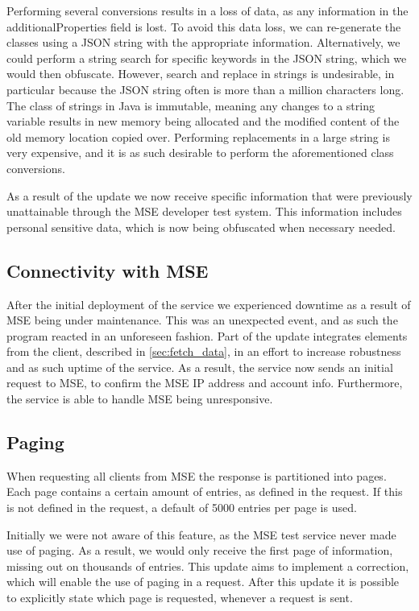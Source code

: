 Performing several conversions results in a loss of data, as any information in the additionalProperties field is lost. To avoid this data loss, we can re-generate the classes using a JSON string with the appropriate information. Alternatively, we could perform a string search for specific keywords in the JSON string, which we would then obfuscate. However, search and replace in strings is undesirable, in particular because the JSON string often is more than a million characters long. The class of strings in Java is immutable, meaning any changes to a string variable results in new memory being allocated and the modified content of the old memory location copied over. Performing replacements in a large string is very expensive, and it is as such desirable to perform the aforementioned class conversions. 

As a result of the update we now receive specific information that were previously unattainable through the MSE developer test system. This information includes personal sensitive data, which is now being obfuscated when necessary needed. 

\subsection*{Connectivity with MSE}
After the initial deployment of the service we experienced downtime as a result of MSE being under maintenance. This was an unexpected event, and as such the program reacted in an unforeseen fashion. Part of the update integrates elements from the client, described in \ref{sec:fetch_data}, in an effort to increase robustness and as such uptime of the service. As a result, the service now sends an initial request to MSE, to confirm the MSE IP address and account info. Furthermore, the service is able to handle MSE being unresponsive.

\subsection*{Paging}
When requesting all clients from MSE the response is partitioned into pages. Each page contains a certain amount of entries, as defined in the request. If this is not defined in the request, a default of 5000 entries per page is used. 

Initially we were not aware of this feature, as the MSE test service never made use of paging. As a result, we would only receive the first page of information, missing out on thousands of entries. This update aims to implement a correction, which will enable the use of paging in a request. After this update it is possible to explicitly state which page is requested, whenever a request is sent.